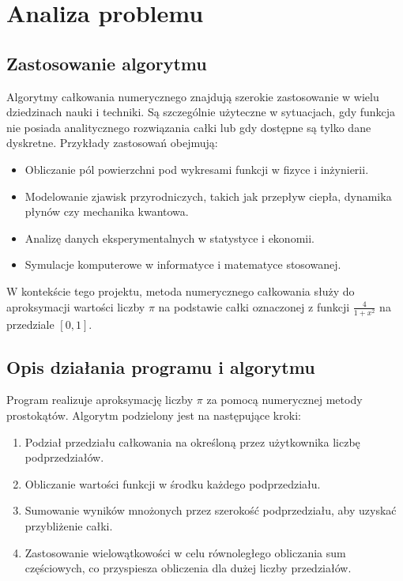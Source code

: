 \newpage
\section{Analiza problemu}

\subsection{Zastosowanie algorytmu}
Algorytmy całkowania numerycznego znajdują szerokie zastosowanie w wielu dziedzinach nauki i techniki. Są szczególnie użyteczne w sytuacjach, gdy funkcja nie posiada analitycznego rozwiązania całki lub gdy dostępne są tylko dane dyskretne. Przykłady zastosowań obejmują:
\begin{itemize}
  \item Obliczanie pól powierzchni pod wykresami funkcji w fizyce i inżynierii.
  \item Modelowanie zjawisk przyrodniczych, takich jak przepływ ciepła, dynamika płynów czy mechanika kwantowa.
  \item Analizę danych eksperymentalnych w statystyce i ekonomii.
  \item Symulacje komputerowe w informatyce i matematyce stosowanej.
\end{itemize}

W kontekście tego projektu, metoda numerycznego całkowania służy do aproksymacji wartości liczby $\pi$ na podstawie całki oznaczonej z funkcji $\frac{4}{1+x^2}$ na przedziale $[0, 1]$.

\subsection{Opis działania programu i algorytmu}
Program realizuje aproksymację liczby $\pi$ za pomocą numerycznej metody prostokątów. Algorytm podzielony jest na następujące kroki:
\begin{enumerate}
  \item Podział przedziału całkowania na określoną przez użytkownika liczbę podprzedziałów.
  \item Obliczanie wartości funkcji w środku każdego podprzedziału.
  \item Sumowanie wyników mnożonych przez szerokość podprzedziału, aby uzyskać przybliżenie całki.
  \item Zastosowanie wielowątkowości w celu równoległego obliczania sum częściowych, co przyspiesza obliczenia dla dużej liczby przedziałów.
\end{enumerate}

